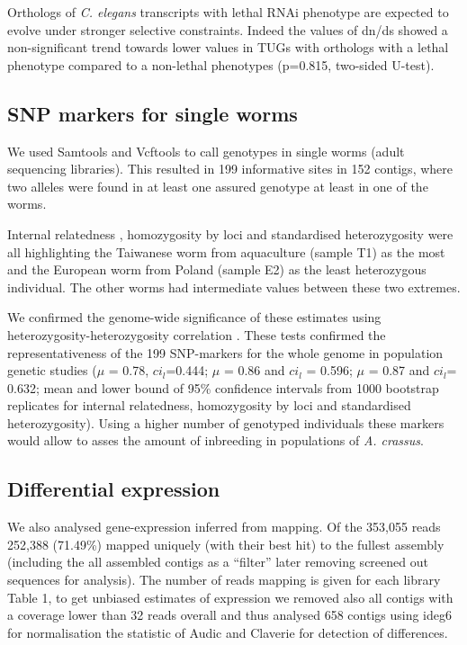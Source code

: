 \documentclass[10pt]{bmc_article}
\newenvironment{bmcformat}{\begin{raggedright}\baselineskip20pt\sloppy\setboolean{publ}{false}}{\end{raggedright}\baselineskip20pt\sloppy}
\begin{document}
\begin{bmcformat}
Orthologs of \textit{C. elegans} transcripts with lethal
RNAi phenotype are expected to evolve under stronger selective
constraints. Indeed the values of dn/ds showed a non-significant trend
towards lower values in TUGs with orthologs with a lethal phenotype
compared to a non-lethal phenotypes
(p=0.815, two-sided U-test).

\subsection*{SNP markers for single worms}

We used Samtools \cite{journals/bioinformatics/LiHWFRHMAD09} and
Vcftools \cite{pmid21653522} to call genotypes in single worms (adult
sequencing libraries). This resulted in 199
informative sites in 152 contigs, where two
alleles were found in at least one assured genotype at least in one of
the worms.

Internal relatedness \cite{pmid11571049}, homozygosity by loci
\cite{pmid17107491} and standardised heterozygosity \cite{coltman81j}
were all highlighting the Taiwanese worm from aquaculture (sample T1)
as the most and the European worm from Poland (sample E2) as the least
heterozygous individual. The other worms had intermediate values
between these two extremes.

We confirmed the genome-wide significance of these estimates using
heterozygosity-heterozygosity correlation \cite{pmid21565077}. These
tests confirmed the representativeness of the 199
SNP-markers for the whole genome in population genetic studies ($\mu$
= 0.78, $ci_l$=0.444; $\mu$ = 0.86 and $ci_l$ = 0.596; $\mu$ = 0.87
and $ci_l$= 0.632; mean and lower bound of 95\% confidence intervals
from 1000 bootstrap replicates for internal relatedness, homozygosity
by loci and standardised heterozygosity). Using a higher number of
genotyped individuals these markers would allow to asses the amount of
inbreeding in populations of \textit{A. crassus}.

 \subsection*{Differential expression}
                






We also analysed gene-expression inferred from mapping. Of the
353,055 reads 252,388
(71.49\%) mapped uniquely
(with their best hit) to the fullest assembly (including the all
assembled contigs as a ``filter'' later removing screened out
sequences for analysis). The number of reads mapping is given for each
library Table 1, to get unbiased estimates of expression we removed
also all contigs with a coverage lower than 32 reads overall and thus
analysed 658 contigs using ideg6
\cite{pmid12429865} for normalisation the statistic of Audic and
Claverie \cite{pmid9331369} for detection of differences.


\end{bmcformat}
\end{document}

